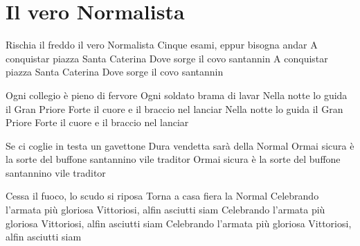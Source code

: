 \section{Il vero Normalista}
\subtitle{Sulla melodia di “Katyusha“}
\begin{canzone}
Rischia il freddo il vero Normalista
Cinque esami, eppur bisogna andar
A conquistar piazza Santa Caterina
Dove sorge il covo santannin
A conquistar piazza Santa Caterina
Dove sorge il covo santannin

Ogni collegio è pieno di fervore
Ogni soldato brama di lavar
Nella notte lo guida il Gran Priore
Forte il cuore e il braccio nel lanciar
Nella notte lo guida il Gran Priore
Forte il cuore e il braccio nel lanciar

Se ci coglie in testa un gavettone
Dura vendetta sarà della Normal
Ormai sicura è la sorte del buffone
santannino vile traditor
Ormai sicura è la sorte del buffone
santannino vile traditor

Cessa il fuoco, lo scudo si riposa
Torna a casa fiera la Normal
Celebrando l'armata più gloriosa
Vittoriosi, alfin asciutti siam
Celebrando l'armata più gloriosa
Vittoriosi, alfin asciutti siam
Celebrando l'armata più gloriosa
Vittoriosi, alfin asciutti siam
\end{canzone}
